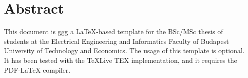 \chapter*{Abstract}

This document is ggg a \LaTeX -based template for the BSc/MSc thesis of students at the Electrical Engineering and Informatics Faculty of Budapest University of Technology and Economics. The usage of this template is optional. It has been tested with the TeXLive TEX implementation, and it requires the PDF-LaTeX compiler.